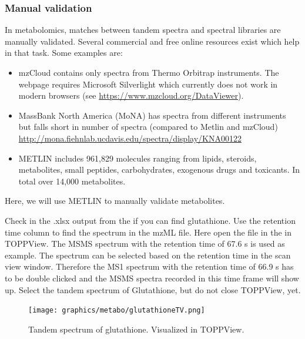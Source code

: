 \subsubsection{Manual validation}

In metabolomics, matches between tandem spectra and spectral libraries are manually validated. Several commercial and free online resources exist which help in that task. Some examples are:

\begin{itemize}
\item mzCloud contains only spectra from Thermo Orbitrap instruments. The webpage requires Microsoft Silverlight which currently does not work in modern browsers (see \url{https://www.mzcloud.org/DataViewer}).
\item MassBank North America (MoNA) has spectra from different instruments but falls short in number of spectra (compared to Metlin and mzCloud) \url{http://mona.fiehnlab.ucdavis.edu/spectra/display/KNA00122}
\item METLIN includes 961,829 molecules ranging from lipids, steroids, metabolites, small peptides, carbohydrates, exogenous drugs and toxicants. In total over 14,000 metabolites.
\end{itemize}

Here, we will use METLIN to manually validate metabolites.

\begin{task}
Check in the .xlsx output from the  if you can find glutathione. Use the retention time column to find the spectrum in the mzML file. Here open the file in the  in  TOPPView. The MSMS spectrum with the retention time of 67.6 s is used as example. The spectrum can be selected based on the retention time in the scan view window. Therefore the MS1 spectrum with the retention time of 66.9 s has to be double clicked and the MSMS spectra recorded in this time frame will show up. Select the tandem spectrum of Glutathione, but do not close TOPPView, yet.
\end{task} 

\begin{figure}[htbp]
  \centering
  \texttt{[image: graphics/metabo/glutathioneTV.png]}
  \caption{Tandem spectrum of glutathione. Visualized in TOPPView.}
  \label{fig:glutathioneTandemSpectrum}
\end{figure}

